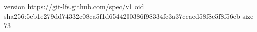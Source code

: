 version https://git-lfs.github.com/spec/v1
oid sha256:5eb1e279dd74332c08ca5f1d6544200386f98334fc3a37ccaed58f8c5f8f56eb
size 73
